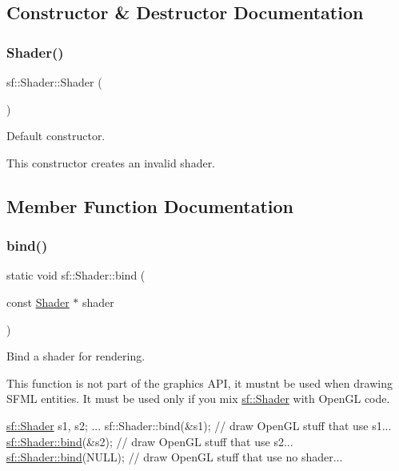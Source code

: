 \subsection{Constructor \& Destructor Documentation}
\mbox{\label{classsf_1_1_shader_a1d7f28f26b4122959fcafec871c2c3c5}} 
\subsubsection{\texorpdfstring{Shader()}{Shader()}}
{\footnotesize\ttfamily sf\+::\+Shader\+::\+Shader (\begin{DoxyParamCaption}{ }\end{DoxyParamCaption})}



Default constructor. 

This constructor creates an invalid shader. 

\subsection{Member Function Documentation}
\mbox{\label{classsf_1_1_shader_a09778f78afcbeb854d608c8dacd8ea30}} 
\subsubsection{\texorpdfstring{bind()}{bind()}}
{\footnotesize\ttfamily static void sf\+::\+Shader\+::bind (\begin{DoxyParamCaption}\item[{const \hyperlink{classsf_1_1_shader}{Shader} $\ast$}]{shader }\end{DoxyParamCaption})\hspace{0.3cm}{\ttfamily [static]}}



Bind a shader for rendering. 

This function is not part of the graphics A\+PI, it mustn\textquotesingle{}t be used when drawing S\+F\+ML entities. It must be used only if you mix \hyperlink{classsf_1_1_shader}{sf\+::\+Shader} with Open\+GL code.


\begin{DoxyCode}
\hyperlink{classsf_1_1_shader}{sf::Shader} s1, s2;
...
sf::Shader::bind(&s1);
\textcolor{comment}{// draw OpenGL stuff that use s1...}
\hyperlink{classsf_1_1_shader_a09778f78afcbeb854d608c8dacd8ea30}{sf::Shader::bind}(&s2);
\textcolor{comment}{// draw OpenGL stuff that use s2...}
\hyperlink{classsf_1_1_shader_a09778f78afcbeb854d608c8dacd8ea30}{sf::Shader::bind}(NULL);
\textcolor{comment}{// draw OpenGL stuff that use no shader...}
\end{DoxyCode}



